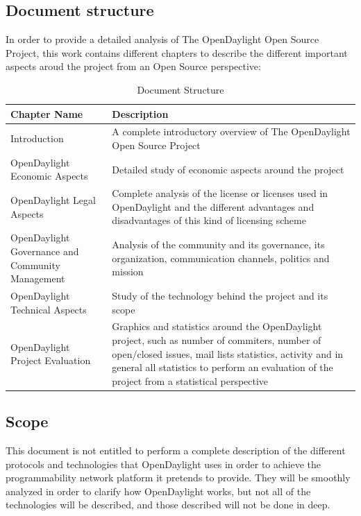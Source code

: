 \documentclass[a4paper, 12pt]{book}
\begin{document}
\subsection{Document structure}

In order to provide a detailed analysis of The OpenDaylight Open Source Project, this work contains different chapters to describe the different important aspects aroud the project from an Open Source perspective:

\begin{table}[H]
\footnotesize
\begin{center}
\begin{tabular}{|p{5cm}|p{10cm}|}
\hline
\textbf{Chapter Name} & \textbf{Description} \\ \hline
Introduction & A complete introductory overview of The OpenDaylight Open Source Project \\
\hline
OpenDaylight Economic Aspects & Detailed study of economic aspects around the project \\
\hline
OpenDaylight Legal Aspects & Complete analysis of the license or licenses used in OpenDaylight and the different advantages and disadvantages of this kind of licensing scheme \\
\hline
OpenDaylight Governance and Community Management & Analysis of the community and its governance, its organization, communication channels, politics and mission \\
\hline
OpenDaylight Technical Aspects & Study of the technology behind the project and its scope \\
\hline
OpenDaylight Project Evaluation & Graphics and statistics around the OpenDaylight project, such as number of commiters, number of open/closed issues, mail lists statistics, activity and in general all statistics to perform an evaluation of the project from a statistical perspective \\
\hline
\end{tabular}
\end{center}
\caption{Document Structure}
\label{tab:documentstructure}
\end{table}

\subsection{Scope}
\label{subsec:scope}
This document is not entitled to perform a complete description of the different protocols and technologies that OpenDaylight uses in order to achieve the programmability network platform it pretends to provide. They will be smoothly analyzed in order to clarify how OpenDaylight works, but not all of the technologies will be described, and those described will not be done in deep.
\end{document}
